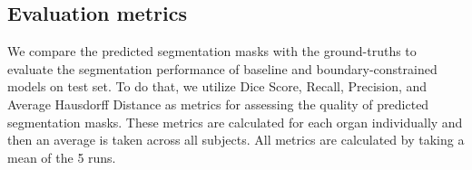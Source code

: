 \documentclass[final,5p,times,twocolumn]{elsarticle}
\begin{document}
\subsection{Evaluation metrics}\label{sec:metrics}
We compare the predicted segmentation masks with the ground-truths to evaluate the segmentation performance of baseline and boundary-constrained models on test set. To do that, we utilize Dice Score, Recall, Precision, and Average Hausdorff Distance as metrics for assessing the quality of predicted segmentation masks. These metrics are calculated for each organ individually and then an average is taken across all subjects. All metrics are calculated by taking a mean of the 5 runs.
\begin{comment}
\subsubsection{Dice Coefficient}
The Dice Coefficient (DC) measures the overlap between two regions by calculating their intersection and dividing it by union (as shown in equation \autoref{eq:eq5}). It is the most commonly used metric in evaluating the performance of medical image segmentation algorithms. DC gives a measurement value between 0 (no overlap) and 1 (complete overlap). 

\end{comment}
\end{document}
